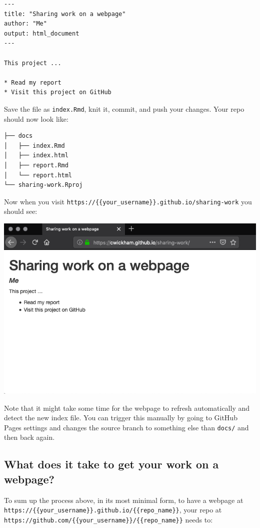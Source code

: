 \documentclass[]{Nemilov}
\begin{document}
\begin{verbatim}
---
title: "Sharing work on a webpage"
author: "Me"
output: html_document
---

This project ...

* Read my report
* Visit this project on GitHub
\end{verbatim}

Save the file as \texttt{index.Rmd}, knit it, commit, and push your changes. Your repo should now look like:

\begin{verbatim}
├── docs
│   ├── index.Rmd
│   ├── index.html
│   ├── report.Rmd
│   └── report.html
└── sharing-work.Rproj
\end{verbatim}

Now when you visit \texttt{https://\{\{your\_username\}\}.github.io/sharing-work} you should see:

\includegraphics{figures/r-publishing/index.png}

Note that it might take some time for the webpage to refresh automatically and detect the new index file. You can trigger this manually by going to GitHub Pages settings and changes the source branch to something else than \texttt{docs/} and then back again.

\hypertarget{what-does-it-take-to-get-your-work-on-a-webpage}{%
\subsection{What does it take to get your work on a webpage?}\label{what-does-it-take-to-get-your-work-on-a-webpage}}

To sum up the process above, in its most minimal form, to have a webpage at \texttt{https://\{\{your\_username\}\}.github.io/\{\{repo\_name\}\}}, your repo at \texttt{https://github.com/\{\{your\_username\}\}/\{\{repo\_name\}\}} needs to:
\end{document}
